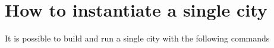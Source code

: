 \section{How to instantiate a single city}

It is possible to build and run a single city with the following commands